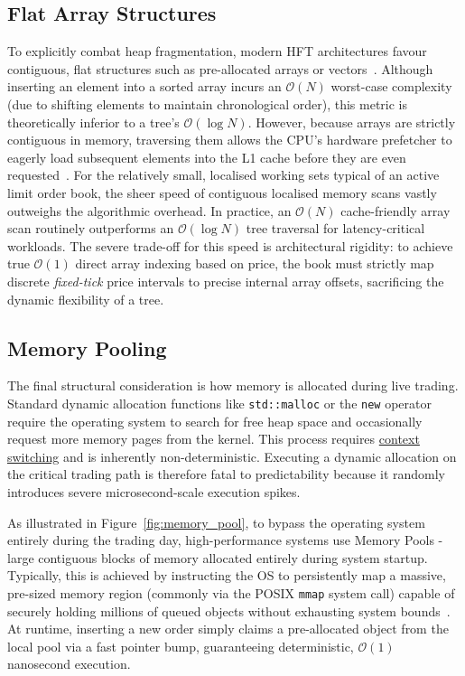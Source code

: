 \subsection{Flat Array Structures}
To explicitly combat heap fragmentation, modern HFT architectures favour 
contiguous, flat structures such as pre-allocated arrays or 
vectors~\citep{bilokon2023cpp}. 
Although inserting an element into a sorted array incurs an $\mathcal{O}(N)$ 
worst-case complexity (due to shifting elements to maintain chronological order), 
this metric is theoretically inferior to a tree's $\mathcal{O}(\log N)$. 
However, because arrays are strictly contiguous in memory, traversing them allows 
the CPU's hardware prefetcher to eagerly load subsequent elements into the L1 
cache before they are even requested~\citep{patterson2013cod}. 
For the relatively small, localised working sets typical of an active limit order 
book, the sheer speed of contiguous localised memory scans vastly outweighs the 
algorithmic overhead. 
In practice, an $\mathcal{O}(N)$ cache-friendly array scan routinely outperforms 
an $\mathcal{O}(\log N)$ tree traversal for latency-critical workloads. 
The severe trade-off for this speed is architectural rigidity: to achieve true 
$\mathcal{O}(1)$ direct array indexing based on price, the book must strictly map 
discrete \textit{fixed-tick} price intervals to precise internal array offsets, 
sacrificing the dynamic flexibility of a tree.

\subsection{Memory Pooling}

The final structural consideration is how memory is allocated during live trading. 
Standard dynamic allocation functions like \texttt{std::malloc} or the \texttt{new} 
operator require the operating system to search for free heap space and occasionally 
request more memory pages from the kernel. 
This process requires \hyperref[app:glossary]{context switching} and is inherently non-deterministic. 
Executing a dynamic allocation on the critical trading path is therefore fatal to 
predictability because it randomly introduces severe microsecond-scale execution spikes. 



As illustrated in Figure~\ref{fig:memory_pool}, to bypass the operating system 
entirely during the trading day, high-performance systems use Memory Pools - 
large contiguous blocks of memory allocated entirely during system startup. 
Typically, this is achieved by instructing the OS to persistently map a massive, 
pre-sized memory region (commonly via the POSIX \texttt{mmap} system call) capable 
of securely holding millions of queued objects without exhausting system bounds~\citep{love2013linux}. 
At runtime, inserting a new order simply claims a pre-allocated object from the 
local pool via a fast pointer bump, guaranteeing deterministic, $\mathcal{O}(1)$ 
nanosecond execution. 

